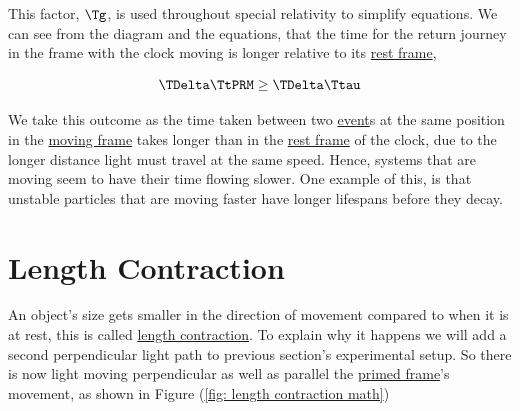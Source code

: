 This factor, ${\Tg }$, is used throughout special relativity to simplify equations.
We can see from the diagram and the equations, that the time for the return journey in the frame with the clock moving is longer relative to its \hyperlink{def-proper-frame}{rest frame},

\begin{equation}
	{\TDelta  \TtPRM  } \geq {\TDelta \Ttau }
\end{equation}

We take this outcome as the time taken between two \hyperlink{def-event}{event}s at the same position in the \hyperlink{def-Moving-Frame}{moving frame} takes longer than in the \hyperlink{def-proper-frame}{rest frame} of the clock, due to the longer distance light must travel at the same speed.
Hence, systems that are moving seem to have their time flowing slower.
One example of this, is that unstable particles that are moving faster have longer lifespans before they decay.

\section{Length Contraction} \label{sect: Length Contraction}

An object's size gets smaller in the direction of movement compared to when it is at rest, this is called \hyperlink{def-length-contraction}{length contraction}.
To explain why it happens we will add a second perpendicular light path to previous section's experimental setup.
So there is now light moving perpendicular as well as parallel the \hyperlink{def-Primed-Frame}{primed frame}'s movement, as shown in Figure (\ref{fig: length contraction math})

